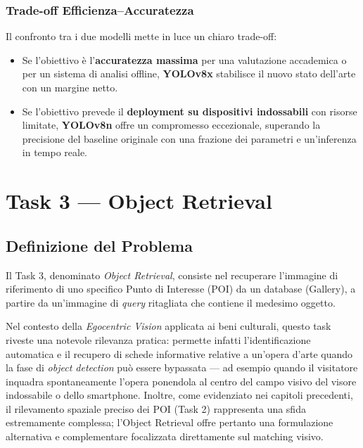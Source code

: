 \documentclass[a4paper,12pt]{report}
\begin{document}
\subsection{Trade-off Efficienza--Accuratezza}

Il confronto tra i due modelli mette in luce un chiaro trade-off:

\begin{itemize}
    \item Se l'obiettivo è l'\textbf{accuratezza massima} per una valutazione accademica o per un sistema di analisi offline, \textbf{YOLOv8x} stabilisce il nuovo stato dell'arte con un margine netto.
    \item Se l'obiettivo prevede il \textbf{deployment su dispositivi indossabili} con risorse limitate, \textbf{YOLOv8n} offre un compromesso eccezionale, superando la precisione del baseline originale con una frazione dei parametri e un'inferenza in tempo reale.
\end{itemize}

\chapter{Task 3 --- Object Retrieval}

\section{Definizione del Problema}

Il Task 3, denominato \emph{Object Retrieval}, consiste nel recuperare l'immagine di riferimento di uno specifico Punto di Interesse (POI) da un database (Gallery), a partire da un'immagine di \emph{query} ritagliata che contiene il medesimo oggetto.

Nel contesto della \emph{Egocentric Vision} applicata ai beni culturali, questo task riveste una notevole rilevanza pratica: permette infatti l'identificazione automatica e il recupero di schede informative relative a un'opera d'arte quando la fase di \emph{object detection} può essere bypassata --- ad esempio quando il visitatore inquadra spontaneamente l'opera ponendola al centro del campo visivo del visore indossabile o dello smartphone. Inoltre, come evidenziato nei capitoli precedenti, il rilevamento spaziale preciso dei POI (Task 2) rappresenta una sfida estremamente complessa; l'Object Retrieval offre pertanto una formulazione alternativa e complementare focalizzata direttamente sul matching visivo.
\end{document}
